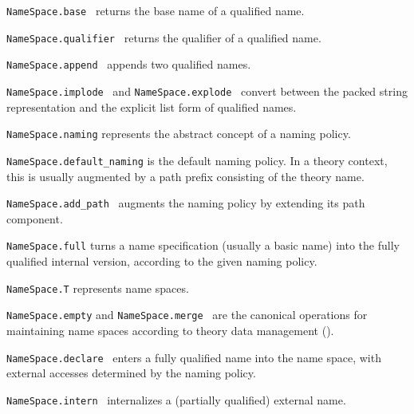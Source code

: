 \begin{isabellebody}
\begin{isamarkuptext}
  \begin{description}

  \item \verb|NameSpace.base|~ returns the base name of a
  qualified name.

  \item \verb|NameSpace.qualifier|~ returns the qualifier
  of a qualified name.

  \item \verb|NameSpace.append|~
  appends two qualified names.

  \item \verb|NameSpace.implode|~ and \verb|NameSpace.explode|~ convert between the packed string
  representation and the explicit list form of qualified names.

  \item \verb|NameSpace.naming| represents the abstract concept of
  a naming policy.

  \item \verb|NameSpace.default_naming| is the default naming policy.
  In a theory context, this is usually augmented by a path prefix
  consisting of the theory name.

  \item \verb|NameSpace.add_path|~ augments the
  naming policy by extending its path component.

  \item \verb|NameSpace.full| turns a name
  specification (usually a basic name) into the fully qualified
  internal version, according to the given naming policy.

  \item \verb|NameSpace.T| represents name spaces.

  \item \verb|NameSpace.empty| and \verb|NameSpace.merge|~ are the canonical operations for
  maintaining name spaces according to theory data management
  ().

  \item \verb|NameSpace.declare|~ enters a
  fully qualified name into the name space, with external accesses
  determined by the naming policy.

  \item \verb|NameSpace.intern|~ internalizes a
  (partially qualified) external name.


\end{description}
\end{isamarkuptext}
\end{isabellebody}
